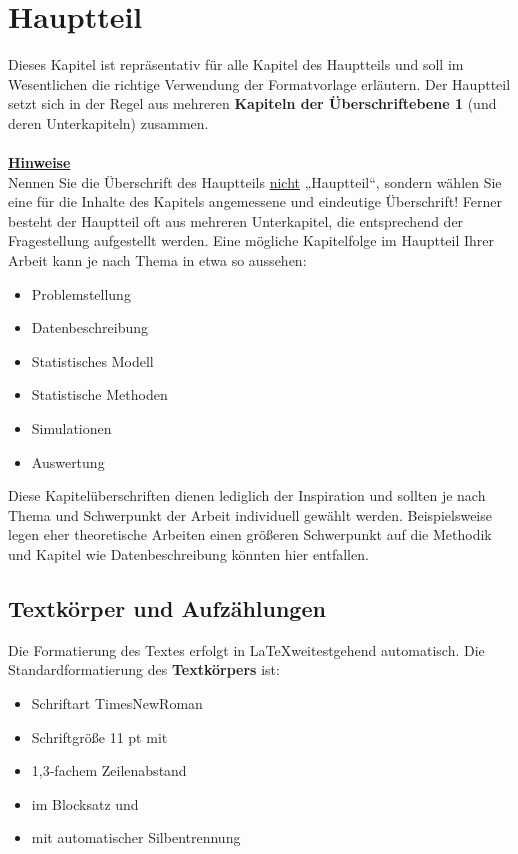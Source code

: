 \section{Hauptteil}

Dieses Kapitel ist repräsentativ für alle Kapitel des Hauptteils und soll im Wesentlichen die richtige Verwendung der Formatvorlage erläutern. Der Hauptteil setzt sich in der Regel aus mehreren \textbf{Kapiteln der Überschriftebene 1} (und deren Unterkapiteln) zusammen.\\
\\
\textbf{\uline{Hinweise}}\\
Nennen Sie die Überschrift des Hauptteils \uline{nicht} „Hauptteil“, sondern wählen Sie eine für die Inhalte des Kapitels angemessene und eindeutige Überschrift! Ferner besteht der Hauptteil oft aus mehreren Unterkapitel, die entsprechend der Fragestellung aufgestellt werden. Eine mögliche Kapitelfolge im Hauptteil Ihrer Arbeit kann je nach Thema in etwa so aussehen:
\begin{itemize}
    \item Problemstellung
    \item Datenbeschreibung
    \item Statistisches Modell
    \item Statistische Methoden
    \item Simulationen
    \item Auswertung
\end{itemize}

Diese Kapitelüberschriften dienen lediglich der Inspiration und sollten je nach Thema und Schwerpunkt der Arbeit individuell gewählt werden. Beispielsweise legen eher theoretische Arbeiten einen größeren Schwerpunkt auf die Methodik und Kapitel wie Datenbeschreibung könnten hier entfallen.
\\

\subsection{Textkörper und Aufzählungen}
Die Formatierung des Textes erfolgt in \LaTeX weitestgehend automatisch.
Die Standardformatierung des \textbf{Textkörpers} ist:
\begin{itemize}
    \item Schriftart TimesNewRoman
    \item Schriftgröße 11 pt mit
    \item 1,3-fachem Zeilenabstand 
    \item im Blocksatz und
    \item mit automatischer Silbentrennung 
\end{itemize}

